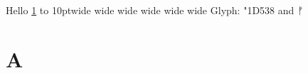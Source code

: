 \documentclass{article}
\begin{document}
Hello \ref{later} \hbox to 10pt{wide wide wide wide wide wide}
Glyph: \char"1D538 and ᚠ
\section{A}\label{later}
\end{document}
